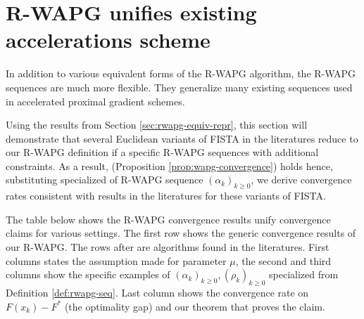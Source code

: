 \documentclass[12pt]{article}
\begin{document}
\section{R-WAPG unifies existing accelerations scheme}\label{sec:rwapg-literatures}
    In addition to various equivalent forms of the R-WAPG algorithm, the R-WAPG sequences are much more flexible.
    They generalize many existing sequences used in accelerated proximal gradient schemes.
    \par
    Using the results from Section \ref{sec:rwapg-equiv-repr}, this section will demonstrate that several Euclidean variants of FISTA in the literatures reduce to our R-WAPG definition if a specific R-WAPG sequences with additional constraints.
    As a result, (Proposition \ref{prop:wapg-convergence}) holds hence, substituting specialized of R-WAPG sequence $(\alpha_k)_{k \ge 0}$, we derive convergence rates consistent with results in the literatures for these variants of FISTA.
    \par
    The table below shows the R-WAPG convergence results unify convergence claims for various settings.
    The first row shows the generic convergence results of our R-WAPG.
    The rows after are algorithms found in the literatures.
    First columns states the assumption made for parameter $\mu$, the second and third columns show the specific examples of $(\alpha_k)_{k \ge 0}, (\rho_k)_{k \ge0}$ specialized from Definition \ref{def:rwapg-seq}.
    Last column shows the convergence rate on $F(x_k) - F^*$ (the optimality gap) and our theorem that proves the claim.
\end{document}
